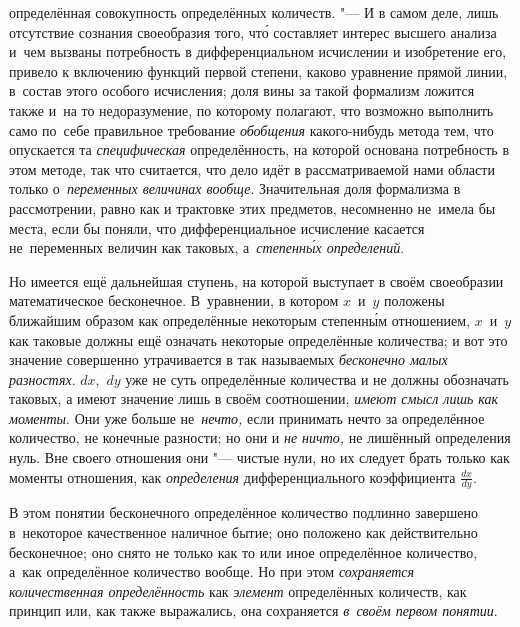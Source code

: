определённая совокупность определённых количеств. "--- И в самом деле, лишь
отсутствие сознания своеобразия того, чт\'{о} составляет интерес высшего анализа
и~чем вызваны потребность в дифференциальном исчислении и изобретение его,
привело к включению функций первой степени, каково уравнение прямой линии,
в~состав этого особого исчисления; доля вины за такой формализм ложится также
и~на то недоразумение, по которому полагают, что возможно выполнить само
по~себе правильное требование {\em обобщения} какого-нибудь метода тем, что
опускается та {\em специфическая} определённость, на которой основана
потребность в этом методе, так что считается, что дело идёт в рассматриваемой
нами области только о~{\em переменных величинах вообще}. Значительная доля
формализма в рассмотрении, равно как и трактовке этих предметов, несомненно
не~имела бы места, если бы поняли, что дифференциальное исчисление касается
не~переменных величин как таковых, а~{\em степенн\'{ы}х определений}.

Но имеется ещё дальнейшая ступень, на которой выступает в своём своеобразии
математическое бесконечное. В~уравнении, в котором $x$~и~$y$ положены ближайшим
образом как определённые некоторым степенн\'{ы}м отношением, $x$~и~$y$ как
таковые должны ещё означать некоторые определённые количества; и вот это
значение совершенно утрачивается в так называемых
{\em бесконечно малых разностях}. $dx$,~$dy$ уже не суть определённые
количества и не должны обозначать таковых, а имеют значение лишь в своём
соотношении, {\em имеют смысл лишь как моменты}. Они уже больше
не~{\em нечто,} если принимать нечто за определённое количество, не конечные
разности; но они и {\em не ничто,} не лишённый определения нуль. Вне своего
отношения они "--- чистые нули, но их следует брать только как моменты
отношения, как {\em определения} дифференциального
коэффициента $\frac{dx}{dy}$.

В этом понятии бесконечного определённое количество подлинно завершено
в~некоторое качественное наличное бытие; оно положено как действительно
бесконечное; оно снято не только как то или иное определённое количество,
а~как определённое количество вообще. Но при этом
{\em сохраняется количественная определённость} как {\em элемент}
определённых количеств, как принцип или, как также выражались,
она сохраняется {\em в~своём первом понятии}.

